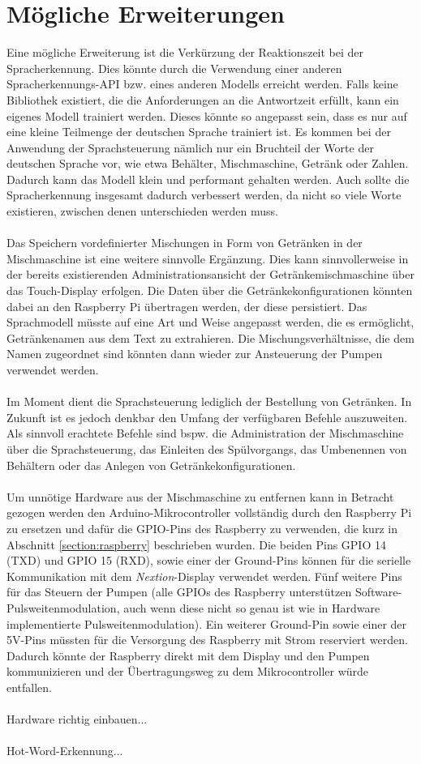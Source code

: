 \section{Mögliche Erweiterungen}
Eine mögliche Erweiterung ist die Verkürzung der Reaktionszeit bei der Spracherkennung. Dies könnte durch die Verwendung einer anderen Spracherkennungs-\ac{API} bzw. eines anderen Modells erreicht werden. Falls keine Bibliothek existiert, die die Anforderungen an die Antwortzeit erfüllt, kann ein eigenes Modell trainiert werden. Dieses könnte so angepasst sein, dass es nur auf eine kleine Teilmenge der deutschen Sprache trainiert ist. Es kommen bei der Anwendung der Sprachsteuerung nämlich nur ein Bruchteil der Worte der deutschen Sprache vor, wie etwa \glqq{}Behälter\grqq{}, \glqq{}Mischmaschine\grqq{}, \glqq{}Getränk\grqq{} oder Zahlen. Dadurch kann das Modell klein und performant gehalten werden. Auch sollte die Spracherkennung insgesamt dadurch verbessert werden, da nicht so viele Worte existieren, zwischen denen unterschieden werden muss.\\\\
Das Speichern vordefinierter Mischungen in Form von Getränken in der Mischmaschine ist eine weitere sinnvolle Ergänzung. Dies kann sinnvollerweise in der bereits existierenden Administrationsansicht der Getränkemischmaschine über das Touch-Display erfolgen. Die Daten über die Getränkekonfigurationen könnten dabei an den Raspberry Pi übertragen werden, der diese persistiert. Das Sprachmodell müsste auf eine Art und Weise angepasst werden, die es ermöglicht, Getränkenamen aus dem Text zu extrahieren. Die Mischungsverhältnisse, die dem Namen zugeordnet sind könnten dann wieder zur Ansteuerung der Pumpen verwendet werden.\\\\
Im Moment dient die Sprachsteuerung lediglich der Bestellung von Getränken. In Zukunft ist es jedoch denkbar den Umfang der verfügbaren Befehle auszuweiten. Als sinnvoll erachtete Befehle sind bspw. die Administration der Mischmaschine über die Sprachsteuerung, das Einleiten des Spülvorgangs, das Umbenennen von Behältern oder das Anlegen von Getränkekonfigurationen.\\\\
Um unnötige Hardware aus der Mischmaschine zu entfernen kann in Betracht gezogen werden den Arduino-Mikrocontroller vollständig durch den Raspberry Pi zu ersetzen und dafür die \ac{GPIO}-Pins des Raspberry zu verwenden, die kurz in Abschnitt \ref{section:raspberry} beschrieben wurden. Die beiden Pins GPIO 14 (TXD) und GPIO 15 (RXD), sowie einer der Ground-Pins können für die serielle Kommunikation mit dem \textit{Nextion}-Display verwendet werden. Fünf weitere Pins für das Steuern der Pumpen (alle \ac{GPIO}s des Raspberry unterstützen Software-Pulsweitenmodulation, auch wenn diese nicht so genau ist wie in Hardware implementierte Pulsweitenmodulation). Ein weiterer Ground-Pin sowie einer der 5V-Pins müssten für die Versorgung des Raspberry mit Strom reserviert werden. Dadurch könnte der Raspberry direkt mit dem Display und den Pumpen kommunizieren und der Übertragungsweg zu dem Mikrocontroller würde entfallen.\\\\
Hardware richtig einbauen...\\\\
Hot-Word-Erkennung...



